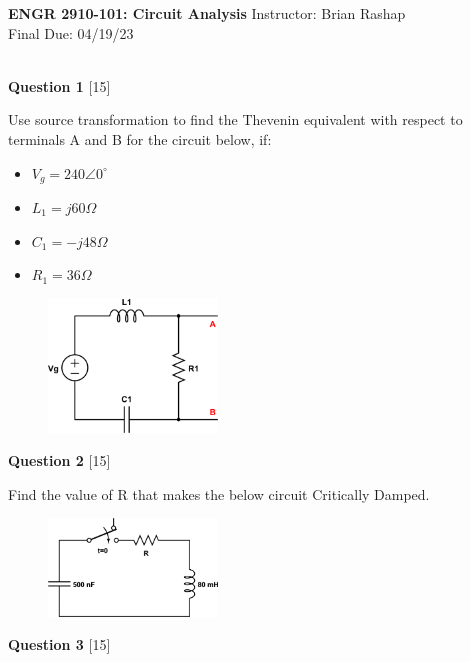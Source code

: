 \documentclass[12pt]{article}
\begin{document}
\begin{center}
\hfil
{\large\bf {ENGR 2910-101: Circuit Analysis}}
\hfill Instructor: Brian Rashap\\
Final \hfill Due: 04/19/23\\
\hrulefill\\
\end{center}


{\bf Question 1} [15] 
\newline

Use source transformation to find the Thevenin equivalent with respect to terminals A and B for the circuit below, if:
\begin{itemize}
\item $V_g = 240 \angle 0^{\circ}$
\item $L_1 = j60 \Omega$
\item $C_1 = -j48 \Omega$
\item $R_1 = 36 \Omega$
\end{itemize}

\begin{figure}[h!]
\centering 
\includegraphics[clip,width=0.40\textwidth]{final_1.png}
\end{figure}

\newpage

{\bf Question 2} [15]
\newline

Find the value of R that makes the below circuit Critically Damped.

\begin{figure}[h!]
\centering 
\includegraphics[clip,width=0.40\textwidth]{final_2.png}
\end{figure}

\newpage

{\bf Question 3} [15]
\newline
\end{document}
